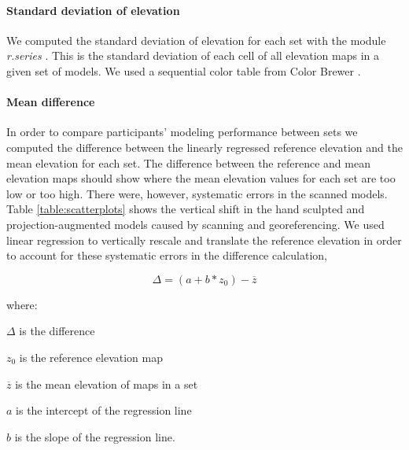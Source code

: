 \documentclass[prodmode,acmtochi]{acmsmall} %
\begin{document}
\paragraph{Standard deviation of elevation}
We computed 
the standard deviation of elevation
for each set
with the module \textit{r.series} \cite{r.series}.
This is the standard deviation of each cell 
of all elevation maps in a given set of models.
We used a sequential color table from Color Brewer
\cite{Brewer1994,ColorBrewer}.

\paragraph{Mean difference}
In order to compare participants' modeling performance between sets 
we computed the difference 
between the linearly regressed reference elevation and 
the mean elevation for each set.
%
The difference between the reference and mean elevation maps should show
where the mean elevation values for each set are too low or too high. 
%
There were, however, systematic errors in the scanned models.
%
Table \ref{table:scatterplots} shows the vertical shift 
in the hand sculpted and projection-augmented models 
caused by scanning and georeferencing.
%
We used linear regression 
to vertically rescale and translate the reference elevation 
in order to account for these systematic errors
in the difference calculation,

\begin{equation}
\label{eq:regressed_mean_difference}
\Delta = (a + b * z_0) - \overline{z}
\end{equation}

where:

\hspace*{1em} $\Delta$ is the difference

\hspace*{1em} $z_0$ is the reference elevation map

\hspace*{1em} $\overline{z}$ is the mean elevation of maps in a set

\hspace*{1em} $a$ is the intercept of the regression line

\hspace*{1em} $b$ is the slope of the regression line.\\
\end{document}
